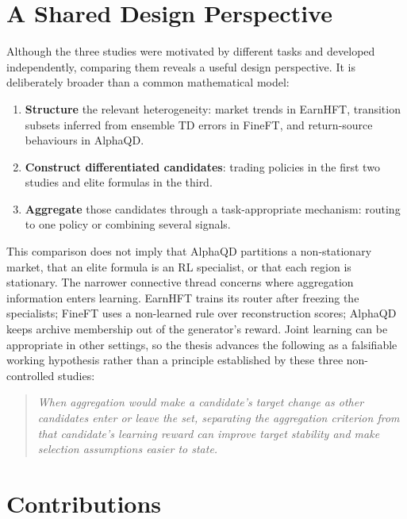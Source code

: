 \section{A Shared Design Perspective}
\label{sec:intro_pattern}

Although the three studies were motivated by different tasks and developed independently, comparing them reveals a useful design perspective. It is deliberately broader than a common mathematical model:

\begin{enumerate}
\item \textbf{Structure} the relevant heterogeneity: market trends in EarnHFT, transition subsets inferred from ensemble TD errors in FineFT, and return-source behaviours in AlphaQD.
\item \textbf{Construct differentiated candidates}: trading policies in the first two studies and elite formulas in the third.
\item \textbf{Aggregate} those candidates through a task-appropriate mechanism: routing to one policy or combining several signals.
\end{enumerate}

This comparison does not imply that AlphaQD partitions a non-stationary market, that an elite formula is an RL specialist, or that each region is stationary. The narrower connective thread concerns where aggregation information enters learning. EarnHFT trains its router after freezing the specialists; FineFT uses a non-learned rule over reconstruction scores; AlphaQD keeps archive membership out of the generator's reward. Joint learning can be appropriate in other settings, so the thesis advances the following as a falsifiable working hypothesis rather than a principle established by these three non-controlled studies:
\begin{quote}
\itshape When aggregation would make a candidate's target change as other candidates enter or leave the set, separating the aggregation criterion from that candidate's learning reward can improve target stability and make selection assumptions easier to state.
\end{quote}

\section{Contributions}
\label{sec:intro_contributions}

